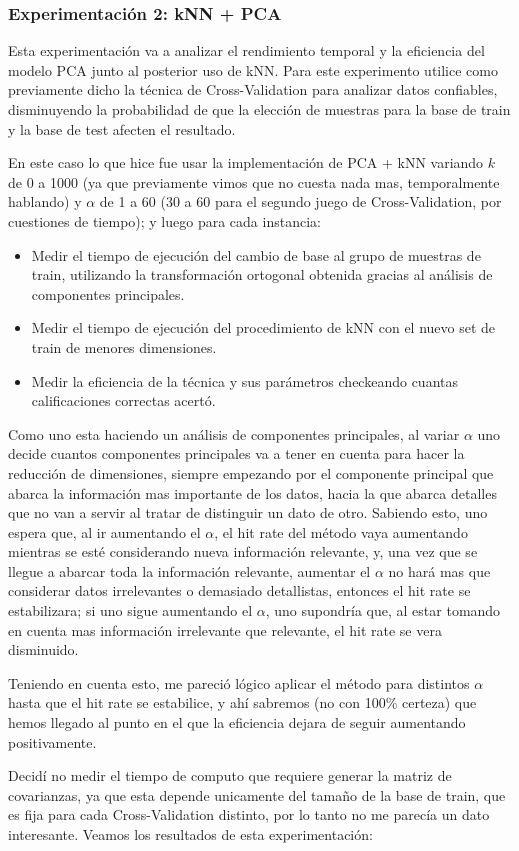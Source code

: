 \documentclass[a4paper]{article}
\begin{document}
\subsubsection{Experimentación 2: kNN + PCA}
Esta experimentación va a analizar el rendimiento temporal y la eficiencia del modelo PCA junto al posterior uso de kNN. Para este experimento utilice como previamente dicho la técnica de Cross-Validation para analizar datos confiables, disminuyendo la probabilidad de que la elección de muestras para la base de train y la base de test afecten el resultado.\par
En este caso lo que hice fue usar la implementación de PCA + kNN variando $k$ de 0 a 1000 (ya que previamente vimos que no cuesta nada mas, temporalmente hablando) y $\alpha$ de 1 a 60 (30 a 60 para el segundo juego de Cross-Validation, por cuestiones de tiempo); y luego para cada instancia:
\begin{itemize}
\item Medir el tiempo de ejecución del cambio de base al grupo de muestras de train, utilizando la transformación ortogonal obtenida gracias al análisis de componentes principales.
\item Medir el tiempo de ejecución del procedimiento de kNN con el nuevo set de train de menores dimensiones.
\item Medir la eficiencia de la técnica y sus parámetros checkeando cuantas calificaciones correctas acertó.
\end{itemize}\par
Como uno esta haciendo un análisis de componentes principales, al variar $\alpha$ uno decide cuantos componentes principales va a tener en cuenta para hacer la reducción de dimensiones, siempre empezando por el componente principal que abarca la información mas importante de los datos, hacia la que abarca detalles que no van a servir al tratar de distinguir un dato de otro. Sabiendo esto, uno espera que, al ir aumentando el $\alpha$, el hit rate del método vaya aumentando mientras se esté considerando nueva información relevante, y, una vez que se llegue a abarcar toda la información relevante, aumentar el $\alpha$ no hará mas que considerar datos irrelevantes o demasiado detallistas, entonces el hit rate se estabilizara; si uno sigue aumentando el $\alpha$, uno supondría que, al estar tomando en cuenta mas información irrelevante que relevante, el hit rate se vera disminuido.\par
Teniendo en cuenta esto, me pareció lógico aplicar el método para distintos $\alpha$ hasta que el hit rate se estabilice, y ahí sabremos (no con 100\% certeza) que hemos llegado al punto en el que la eficiencia dejara de seguir aumentando positivamente.\par\smallbreak
Decidí no medir el tiempo de computo que requiere generar la matriz de covarianzas, ya que esta depende unicamente del tamaño de la base de train, que es fija para cada Cross-Validation distinto, por lo tanto no me parecía un dato interesante.
\smallbreak
Veamos los resultados de esta experimentación:
\end{document}
